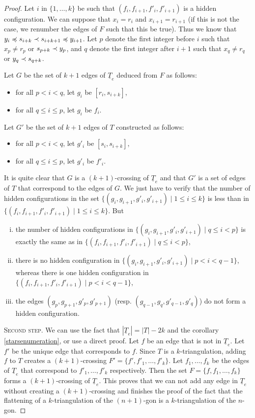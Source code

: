 \documentclass[12pt]{amsart}
\begin{document}
\begin{proof}
Let $i$ in $\{1,\ldots,k\}$ be such that $(f_i,f_{i+1},f'_i,f'_{i+1})$ is a hidden configuration. We can suppose that $x_i=r_i$ and $x_{i+1}=r_{i+1}$ (if this is not the case, we renumber the edges of $F$ such that this be true). Thus we know that $y_i\preccurlyeq s_{i+k}\prec s_{i+k+1}\preccurlyeq y_{i+1}$. Let $p$ denote the first integer before $i$ such that $x_p \ne r_p$ or $s_{p+k}\prec y_p$, and $q$ denote the first integer after $i+1$ such that $x_q \ne r_q$ or $y_q\prec s_{q+k}$.

Let $G$ be the set of $k+1$ edges of $\underline{T}_e$ deduced from $F$ as follows:
\begin{itemize}
\item for all $p<i<q$, let $g_i$ be $[r_i,s_{i+k}]$,
\item for all $q\le i\le p$, let $g_i$ be $f_i$.
\end{itemize}
Let $G'$ be the set of $k+1$ edges of $T$ constructed as follows:
\begin{itemize}
\item for all $p<i<q$, let $g'_i$ be $[s_i,s_{i+k}]$,
\item for all $q\le i\le p$, let $g'_i$ be $f'_i$.
\end{itemize}
		
It is quite clear that $G$ is a $(k+1)$-crossing of $\underline{T}_e$ and that $G'$ is a set of edges of $T$ that correspond to the edges of $G$. We just have to verify that the number of hidden configurations in the set $\{(g_i,g_{i+1},g'_i,g'_{i+1})\;|\; 1\le i\le k\}$ is less than in $\{(f_i,f_{i+1},f'_i,f'_{i+1})\;|\; 1\le i\le k\}$. But
\begin{enumerate}[(i)]
\item the number of hidden configurations in $\{(g_i,g_{i+1},g'_i,g'_{i+1})\;|\; q\le i<p\}$ is exactly the same as in $\{(f_i,f_{i+1},f'_i,f'_{i+1})\;|\; q\le i<p\}$,
\item there is no hidden configuration in $\{(g_i,g_{i+1},g'_i,g'_{i+1})\;|\; p<i<q-1\}$, whereas there is one hidden configuration in $\{(f_i,f_{i+1},f'_i,f'_{i+1})\;|\; p<i<q-1\}$,
\item the edges $(g_p,g_{p+1},g'_p,g'_{p+1})$ (resp. $(g_{q-1},g_q,g'_{q-1},g'_q)$) do not form a hidden configuration.
\end{enumerate}


\medskip
\noindent\textsc{Second step.}
We can use the fact that $|\underline{T}_e|=|T|-2k$ and the corollary \ref{starsenumeration}, or use a direct proof. Let $f$ be an edge that is not in $\underline{T}_e$. Let $f'$ be the unique edge that corresponds to $f$. Since $T$ is a $k$-triangulation, adding $f$ to $T$ creates a $(k+1)$-crossing $F'=\{f',f'_1,\ldots,f'_k\}$. Let $f_1,\ldots,f_k$ be the edges of $\underline{T}_e$ that correspond to $f'_1,\ldots,f'_k$ respectively. Then the set $F=\{f,f_1,\ldots,f_k\}$ forms a $(k+1)$-crossing of $\underline{T}_e$. This proves that we can not add any edge in $\underline{T}_e$ without creating a $(k+1)$-crossing and finishes the proof of the fact that the flattening of a $k$-triangulation of the $(n+1)$-gon is a $k$-triangulation of the $n$-gon.


\end{proof}
\end{document}
